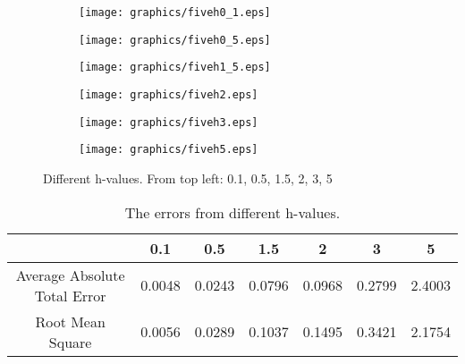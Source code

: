 			\begin{figure} [H]
				\begin{center}
					\begin{subfigure}{0.3\textwidth}
						\begin{center}
							\texttt{[image: graphics/fiveh0\_1.eps]}
						\end{center}
					\end{subfigure}
					\begin{subfigure}{0.3\textwidth}
						\begin{center}
							\texttt{[image: graphics/fiveh0\_5.eps]}
						\end{center}
					\end{subfigure}
					\begin{subfigure}{0.3\textwidth}
						\begin{center}
							\texttt{[image: graphics/fiveh1\_5.eps]}
						\end{center}
					\end{subfigure}
					\begin{subfigure}{0.3\textwidth}
						\begin{center}
							\texttt{[image: graphics/fiveh2.eps]}
						\end{center}
					\end{subfigure}
					\begin{subfigure}{0.3\textwidth}
						\begin{center}
							\texttt{[image: graphics/fiveh3.eps]}
						\end{center}
					\end{subfigure}
					\begin{subfigure}{0.3\textwidth}
						\begin{center}
							\texttt{[image: graphics/fiveh5.eps]}
						\end{center}
					\end{subfigure}
					\caption[Different h-values]{Different h-values. From top left: 0.1, 0.5, 1.5, 2, 3, 5}
					\label{fig:pl2}
				\end{center}
			\end{figure}
		
			\begin{table}[H]
				\begin{tabular}{c|cccccc}				
					& 0.1 & 0.5 & 1.5 & 2 & 3 & 5 \\ \hline
					\rowcolor{lgray}
					Average Absolute Total Error	& 0.0048 & 0.0243 & 0.0796 & 0.0968 & 0.2799 &  2.4003 \\ 
					Root Mean Square				& 0.0056 & 0.0289 & 0.1037 & 0.1495 & 0.3421 & 2.1754 \\ 
				\end{tabular}
				\caption{The errors from different h-values.}
				\label{tb:err1}
			\end{table}
		
